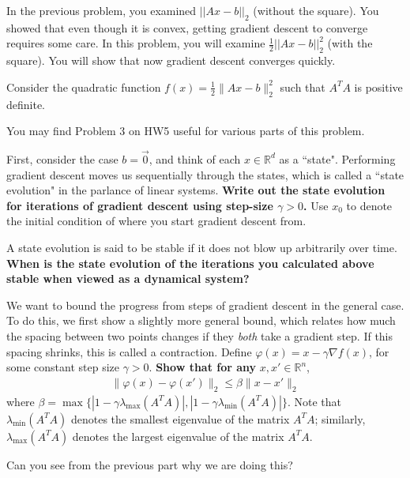 
\newcommand{\CC}{\beta}  
In the previous problem, you examined $||Ax-b||_2$ (without the square). You showed that even though it is convex, getting gradient descent to converge requires some care. In this problem, you will examine $\frac{1}{2}||Ax-b||_2^2$ (with the square). You will show that now gradient descent converges quickly.

Consider the quadratic function $f(x) = \frac{1}{2} \| Ax-b \|_2^2$ such that $A^TA$ is positive definite.

You may find Problem 3 on HW5 useful for various parts of this problem.

\begin{Parts}

\Part First, consider the case $b = \vec{0}$, and think of each $x \in \mathbb{R}^d$
as a ``state". Performing gradient descent moves us sequentially through the states,
which is called a ``state evolution" in the parlance of linear systems.
{\bf Write out the state
evolution for iterations of gradient descent using step-size
$\gamma > 0$. } Use $x_0$ to denote the initial condition of where you
start gradient descent from.  

\Part A state evolution is said to be stable if it does not blow up arbitrarily
over time. {\bf When is the state evolution of the iterations you
  calculated above stable when viewed as a dynamical system?} 

\Part We want to bound the progress from steps of gradient descent in
the general case. To do this, we first show a slightly more general bound,
which relates how much the spacing between two points changes if they
\textit{both} take a gradient step. If this spacing shrinks, this is called a contraction. Define $\varphi(x) = x - \gamma \nabla f(x)$, for some constant step size $\gamma > 0$. \textbf{Show that for any} $x,x' \in \mathbb{R}^n$,
\begin{align*}
\| \varphi(x) - \varphi(x') \|_2 \leq \CC \| x - x'\|_2
\end{align*}
where $\beta = \max \{ | 1 - \gamma \lambda_{\max}(A^TA) |, | 1 -
\gamma \lambda_{\min}(A^TA) | \}$. Note that $\lambda_{\min}(A^TA)$
denotes the smallest eigenvalue of the matrix $A^TA$; similarly,
$\lambda_{\max}(A^TA)$ denotes the largest eigenvalue of the matrix
$A^TA$. 

Can you see from the previous part why we are doing this?





\end{Parts}
